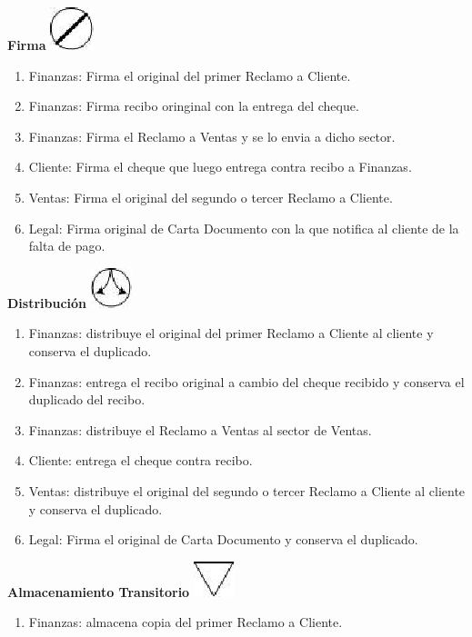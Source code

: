 \begin{center}
  \textbf{Firma}
  \includegraphics{./Images/Simbolos/simbolo-Firma.png}
\end{center}
\begin{enumerate}
\item Finanzas: Firma el original del primer Reclamo a Cliente.
\item Finanzas: Firma recibo oringinal con la entrega del cheque.
\item Finanzas: Firma el Reclamo a Ventas y se lo envia a dicho sector.
\item Cliente: Firma el cheque que luego entrega contra recibo a Finanzas.
\item Ventas: Firma el original del segundo o tercer Reclamo a Cliente.
\item Legal: Firma original de Carta Documento con la que notifica al cliente de la falta de pago.
\end{enumerate}

\begin{center}
  \textbf{Distribución}
  \includegraphics{./Images/Simbolos/simbolo-Distribucion.png}
\end{center}
\begin{enumerate}
\item Finanzas: distribuye el original del primer Reclamo a Cliente al cliente y conserva el duplicado.
\item Finanzas: entrega el recibo original a cambio del cheque recibido y conserva el duplicado del recibo.
\item Finanzas: distribuye el Reclamo a Ventas al sector de Ventas.
\item Cliente: entrega el cheque contra recibo.
\item Ventas: distribuye el original del segundo o tercer Reclamo a Cliente al cliente y conserva el duplicado.
\item Legal: Firma el original de Carta Documento y conserva el duplicado.
\end{enumerate}

\begin{center}
  \textbf{Almacenamiento Transitorio}
  \includegraphics{./Images/Simbolos/simbolo-Almacenamiento-Transitorio.png}
\end{center}
\begin{enumerate}
\item Finanzas: almacena copia del primer Reclamo a Cliente.
\end{enumerate}

